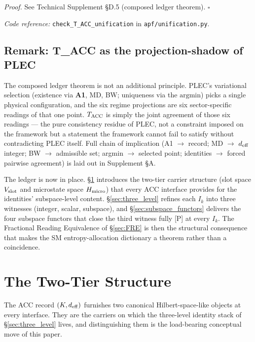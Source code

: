 \documentclass[11pt]{article}
\newcommand{\coderef}[2]{\smallskip\noindent\textit{Code reference:} \texttt{#1} in \texttt{#2}.}
\newcommand{\Aone}{\textbf{A1}}
\begin{document}
\noindent\textit{Proof.} See Technical Supplement \S D.5 (composed ledger theorem). \hfill$\square$

\smallskip

\coderef{check\_T\_ACC\_unification}{apf/unification.py}

\subsection{Remark: T\_ACC as the projection-shadow of PLEC}\label{sec:ledger_plec_bridge}

The composed ledger theorem is not an additional principle.  PLEC's variational selection (existence via \Aone{}, MD, BW; uniqueness via the $\mathrm{argmin}$) picks a single physical configuration, and the six regime projections are six sector-specific readings of that one point.  $T_{\rm ACC}$ is simply the joint agreement of those six readings --- the pure consistency residue of PLEC, not a constraint imposed on the framework but a statement the framework cannot fail to satisfy without contradicting PLEC itself.  Full chain of implication (A1 $\to$ record; MD $\to$ $d_{\rm eff}$ integer; BW $\to$ admissible set; argmin $\to$ selected point; identities $\to$ forced pairwise agreement) is laid out in Supplement \S A.

\smallskip

The ledger is now in place. \S\ref{sec:two_tier} introduces the two-tier carrier structure (slot space $V_{\rm slot}$ and microstate space $H_{\rm micro}$) that every ACC interface provides for the identities' subspace-level content. \S\ref{sec:three_level} refines each $I_k$ into three witnesses (integer, scalar, subspace), and \S\ref{sec:subspace_functors} delivers the four subspace functors that close the third witness fully [P] at every $I_k$. The Fractional Reading Equivalence of \S\ref{sec:FRE} is then the structural consequence that makes the SM entropy-allocation dictionary a theorem rather than a coincidence.

\section{The Two-Tier Structure}\label{sec:two_tier}

The ACC record $(K, d_{\rm eff})$ furnishes two canonical Hilbert-space-like objects at every interface. They are the carriers on which the three-level identity stack of \S\ref{sec:three_level} lives, and distinguishing them is the load-bearing conceptual move of this paper.
\end{document}
